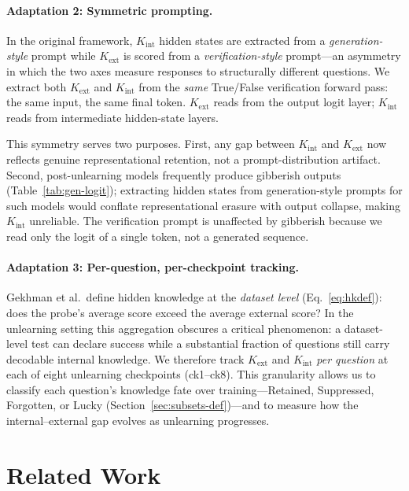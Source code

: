 \documentclass[11pt]{article}
\begin{document}
\paragraph{Adaptation 2: Symmetric prompting.}
In the original framework, $K_\text{int}$ hidden states are extracted from a
\emph{generation-style} prompt while $K_\text{ext}$ is scored from a
\emph{verification-style} prompt---an asymmetry in which the two axes measure
responses to structurally different questions.
We extract both $K_\text{ext}$ and $K_\text{int}$ from the \emph{same}
True/False verification forward pass: the same input, the same final token.
$K_\text{ext}$ reads from the output logit layer; $K_\text{int}$ reads from
intermediate hidden-state layers.

This symmetry serves two purposes.
First, any gap between $K_\text{int}$ and $K_\text{ext}$ now reflects genuine
representational retention, not a prompt-distribution artifact.
Second, post-unlearning models frequently produce gibberish outputs
(Table~\ref{tab:gen-logit}); extracting hidden states from generation-style
prompts for such models would conflate representational erasure with output
collapse, making $K_\text{int}$ unreliable.
The verification prompt is unaffected by gibberish because we read only the
logit of a single token, not a generated sequence.

\paragraph{Adaptation 3: Per-question, per-checkpoint tracking.}
Gekhman et al.\ define hidden knowledge at the \emph{dataset level}
(Eq.~\ref{eq:hkdef}): does the probe's average score exceed the average external
score?
In the unlearning setting this aggregation obscures a critical phenomenon: a
dataset-level test can declare success while a substantial fraction of questions
still carry decodable internal knowledge.
We therefore track $K_\text{ext}$ and $K_\text{int}$ \emph{per question} at
each of eight unlearning checkpoints (ck1--ck8).
This granularity allows us to classify each question's knowledge fate over
training---Retained, Suppressed, Forgotten, or Lucky
(Section~\ref{sec:subsets-def})---and to measure how the internal--external gap
evolves as unlearning progresses.

\section{Related Work}
\label{sec:related}
\end{document}
